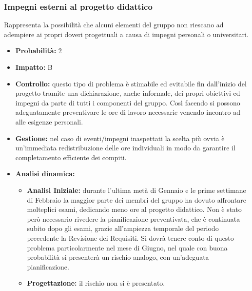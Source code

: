 \documentclass[a4paper,11pt]{article}
\begin{document}
		\subsubsection{Impegni esterni al progetto didattico}
		Rappresenta la possibilità che alcuni elementi del gruppo non riescano ad adempiere ai propri doveri progettuali a causa di impegni personali o universitari.
		\begin{itemize}
		\item \textbf{Probabilità:} 2
		\item \textbf{Impatto:} B
		\item \textbf{Controllo:} questo tipo di problema è stimabile ed evitabile fin dall'inizio del progetto tramite una dichiarazione, anche informale, dei propri obiettivi ed impegni da parte di tutti i componenti del gruppo. Così facendo si possono adeguatamente preventivare le ore di lavoro necessarie venendo incontro ad alle esigenze personali.
		\item \textbf{Gestione:} nel caso di eventi/impegni inaspettati la scelta più ovvia è un'immediata redistribuzione delle ore individuali in modo da garantire il completamento efficiente dei compiti.
		\item \textbf{Analisi dinamica:}
			\begin{itemize}
				\item\textbf{Analisi Iniziale:} durante l'ultima metà di Gennaio e le prime settimane di Febbraio la maggior parte dei membri del gruppo ha dovuto affrontare molteplici esami, dedicando meno ore al progetto didattico. Non è stato però necessario rivedere la pianificazione preventivata, che è continuata subito dopo gli esami, grazie all'ampiezza temporale del periodo precedente la Revisione dei Requisiti. Si dovrà tenere conto di questo problema particolarmente nel mese di Giugno, nel quale con buona probabilità si presenterà un rischio analogo, con un'adeguata pianificazione.
				\item\textbf{Progettazione:} il rischio non si è presentato.
			\end{itemize}
		\end{itemize}
\end{document}
